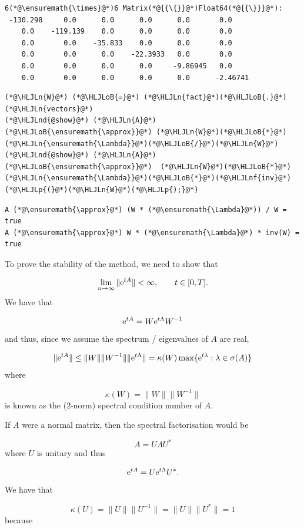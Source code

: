 \documentclass[12pt,a4paper]{article}
\newcommand{\HLJLn}[1]{#1}
\newcommand{\HLJLnd}[1]{\textcolor[RGB]{214,102,97}{#1}}
\newcommand{\HLJLnf}[1]{\textcolor[RGB]{66,102,213}{#1}}
\newcommand{\HLJLoB}[1]{\textcolor[RGB]{102,102,102}{\textbf{#1}}}
\newcommand{\HLJLp}[1]{#1}
\begin{document}
\begin{lstlisting}
6(*@\ensuremath{\times}@*)6 Matrix(*@{{\{}}@*)Float64(*@{{\}}}@*):
 -130.298     0.0      0.0      0.0      0.0       0.0
    0.0    -119.139    0.0      0.0      0.0       0.0
    0.0       0.0    -35.833    0.0      0.0       0.0
    0.0       0.0      0.0    -22.3933   0.0       0.0
    0.0       0.0      0.0      0.0     -9.86945   0.0
    0.0       0.0      0.0      0.0      0.0      -2.46741
\end{lstlisting}


\begin{lstlisting}
(*@\HLJLn{W}@*) (*@\HLJLoB{=}@*) (*@\HLJLn{fact}@*)(*@\HLJLoB{.}@*)(*@\HLJLn{vectors}@*)
(*@\HLJLnd{@show}@*) (*@\HLJLn{A}@*) (*@\HLJLoB{\ensuremath{\approx}}@*) (*@\HLJLn{W}@*)(*@\HLJLoB{*}@*)(*@\HLJLn{\ensuremath{\Lambda}}@*)(*@\HLJLoB{/}@*)(*@\HLJLn{W}@*)
(*@\HLJLnd{@show}@*) (*@\HLJLn{A}@*) (*@\HLJLoB{\ensuremath{\approx}}@*)  (*@\HLJLn{W}@*)(*@\HLJLoB{*}@*)(*@\HLJLn{\ensuremath{\Lambda}}@*)(*@\HLJLoB{*}@*)(*@\HLJLnf{inv}@*)(*@\HLJLp{(}@*)(*@\HLJLn{W}@*)(*@\HLJLp{);}@*)
\end{lstlisting}

\begin{lstlisting}
A (*@\ensuremath{\approx}@*) (W * (*@\ensuremath{\Lambda}@*)) / W = true
A (*@\ensuremath{\approx}@*) W * (*@\ensuremath{\Lambda}@*) * inv(W) = true
\end{lstlisting}


To prove the stability of the method, we need to show that

\[
\lim_{n \to \infty}\| {\rm e}^{tA} \| < \infty, \qquad t \in [0, T].
\]
We have that

\[
{\rm e}^{tA} = W{\rm e}^{t\Lambda}W^{-1}
\]
and thus, since we assume the spectrum / eigenvalues of $A$ are real,

\[
\| {\rm e}^{tA} \| \leq \| W \| \| W^{-1} \| \| {\rm e}^{t\Lambda} \| = \kappa(W)\max\lbrace {\rm e}^{t\lambda} : \lambda \in \sigma(A)  \rbrace
\]
where

\[
\kappa(W) = \| W \| \| W^{-1} \|
\]
is known as the (2-norm) spectral condition number of $A$.  

If $A$ were a normal matrix, then the spectral factorisation would be

\[
A = U\Lambda U^*
\]
where $U$ is unitary and thus

\[
{\rm e}^{tA} = U{\rm e}^{t\Lambda}U^*.
\]
We have that

\[
\kappa(U) = \| U \| \| U^{-1} \| = \| U \| \| U^* \| = 1
\]
because
\end{document}

